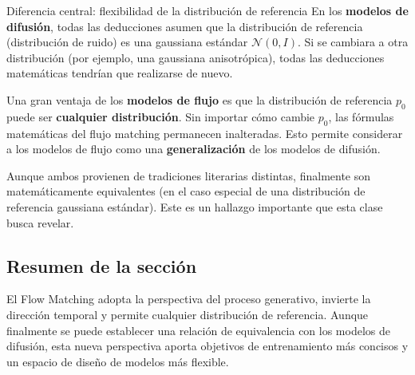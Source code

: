 \begin{importantbox}{Diferencia central: flexibilidad de la distribución de referencia}
En los \textbf{modelos de difusión}, todas las deducciones asumen que la distribución de referencia (distribución de ruido) es una gaussiana estándar $\mathcal{N}(0, I)$. Si se cambiara a otra distribución (por ejemplo, una gaussiana anisotrópica), todas las deducciones matemáticas tendrían que realizarse de nuevo.

Una gran ventaja de los \textbf{modelos de flujo} es que la distribución de referencia $p_0$ puede ser \textbf{cualquier distribución}. Sin importar cómo cambie $p_0$, las fórmulas matemáticas del flujo matching permanecen inalteradas. Esto permite considerar a los modelos de flujo como una \textbf{generalización} de los modelos de difusión.
\end{importantbox}

Aunque ambos provienen de tradiciones literarias distintas, finalmente son matemáticamente equivalentes (en el caso especial de una distribución de referencia gaussiana estándar). Este es un hallazgo importante que esta clase busca revelar.

\subsection{Resumen de la sección}

El Flow Matching adopta la perspectiva del proceso generativo, invierte la dirección temporal y permite cualquier distribución de referencia. Aunque finalmente se puede establecer una relación de equivalencia con los modelos de difusión, esta nueva perspectiva aporta objetivos de entrenamiento más concisos y un espacio de diseño de modelos más flexible.
